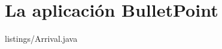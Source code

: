 %
%
%

\chapter{La aplicación BulletPoint} \label{chap:LaAplicacion} 



{listings/Arrival.java} %






